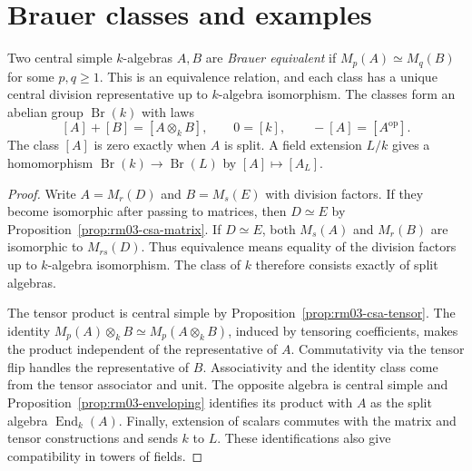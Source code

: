 \section{Brauer classes and examples}

\begin{theorem}
\label{thm:rm03-brauer-group}
Two central simple \(k\)-algebras \(A,B\) are \emph{Brauer
equivalent} if \(M_p(A)\simeq M_q(B)\) for some \(p,q\geq 1\).
This is an equivalence relation, and each class has a unique
central division representative up to \(k\)-algebra isomorphism.
The classes form an abelian group \(\operatorname{Br}(k)\)
with laws
\[
 [A]+[B]=[A\otimes_k B],\qquad 0=[k],\qquad -[A]=[A^{\mathrm{op}}].
\]
The class \([A]\) is zero exactly when \(A\) is split. A field
extension \(L/k\) gives a homomorphism
\(\operatorname{Br}(k)\to\operatorname{Br}(L)\) by \([A]\mapsto[A_L]\).
\end{theorem}
\begin{proof}
Write \(A=M_r(D)\) and \(B=M_s(E)\) with division factors.
If they become isomorphic after passing to matrices, then
\(D\simeq E\) by Proposition~\ref{prop:rm03-csa-matrix}.
If \(D\simeq E\), both \(M_s(A)\) and \(M_r(B)\) are
isomorphic to \(M_{rs}(D)\). Thus equivalence means equality
of the division factors up to \(k\)-algebra isomorphism. The
class of \(k\) therefore consists exactly of split algebras.

The tensor product is central simple by
Proposition~\ref{prop:rm03-csa-tensor}. The identity
\(M_p(A)\otimes_k B\simeq M_p(A\otimes_k B)\), induced by
tensoring coefficients, makes the product independent of
the representative of \(A\). Commutativity via the tensor
flip handles the representative of \(B\). Associativity and
the identity class come from the tensor associator and unit.
The opposite algebra is central simple and
Proposition~\ref{prop:rm03-enveloping} identifies its product
with \(A\) as the split algebra \(\operatorname{End}_k(A)\).
Finally, extension of scalars commutes with the matrix and
tensor constructions and sends \(k\) to \(L\). These
identifications also give compatibility in towers of fields.
\end{proof}

